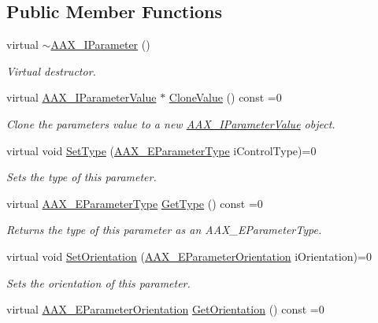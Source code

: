 \subsection*{Public Member Functions}
\begin{DoxyCompactItemize}
\item 
virtual \hyperlink{a00108_a69062a223819c3467ea308c816b28c6b}{$\sim$\+A\+A\+X\+\_\+\+I\+Parameter} ()
\begin{DoxyCompactList}\small\item\em Virtual destructor. \end{DoxyCompactList}\item 
virtual \hyperlink{a00109}{A\+A\+X\+\_\+\+I\+Parameter\+Value} $\ast$ \hyperlink{a00108_a85ce34797e0a9bb3cf05458757144cb9}{Clone\+Value} () const =0
\begin{DoxyCompactList}\small\item\em Clone the parameter\textquotesingle{}s value to a new \hyperlink{a00109}{A\+A\+X\+\_\+\+I\+Parameter\+Value} object. \end{DoxyCompactList}\item 
virtual void \hyperlink{a00108_ac03b38e048e92dd2ec086f9041b52c54}{Set\+Type} (\hyperlink{a00206_a4cd0f189daa9a60cf36883c56344bb2e}{A\+A\+X\+\_\+\+E\+Parameter\+Type} i\+Control\+Type)=0
\begin{DoxyCompactList}\small\item\em Sets the type of this parameter. \end{DoxyCompactList}\item 
virtual \hyperlink{a00206_a4cd0f189daa9a60cf36883c56344bb2e}{A\+A\+X\+\_\+\+E\+Parameter\+Type} \hyperlink{a00108_a0c096b4092b2146d9aa0413bceeaac48}{Get\+Type} () const =0
\begin{DoxyCompactList}\small\item\em Returns the type of this parameter as an A\+A\+X\+\_\+\+E\+Parameter\+Type. \end{DoxyCompactList}\item 
virtual void \hyperlink{a00108_ac8ba9ed15da3c235ef9844177e1cf6d0}{Set\+Orientation} (\hyperlink{a00206_a52f91d1c14aa5dceedabfb9d2de31bf0}{A\+A\+X\+\_\+\+E\+Parameter\+Orientation} i\+Orientation)=0
\begin{DoxyCompactList}\small\item\em Sets the orientation of this parameter. \end{DoxyCompactList}\item 
virtual \hyperlink{a00206_a52f91d1c14aa5dceedabfb9d2de31bf0}{A\+A\+X\+\_\+\+E\+Parameter\+Orientation} \hyperlink{a00108_a232110d283340a29aa33a4eff3bcca03}{Get\+Orientation} () const =0

\end{DoxyCompactItemize}
